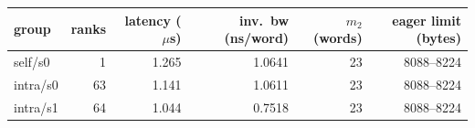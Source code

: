 \begin{tabular}{lrrrrr}
\toprule
group & ranks & latency ($\mu$s) & inv.\ bw (ns/word) & $m_2$ (words) & eager limit (bytes) \\
\midrule
self/s0 & 1 & 1.265 & 1.0641 & 23 & 8088--8224 \\
intra/s0 & 63 & 1.141 & 1.0611 & 23 & 8088--8224 \\
intra/s1 & 64 & 1.044 & 0.7518 & 23 & 8088--8224 \\
\bottomrule
\end{tabular}
